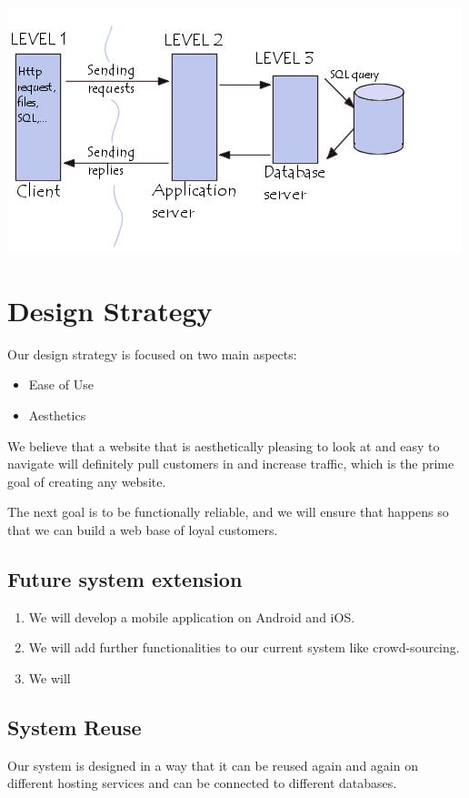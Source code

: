 \documentclass{scrreprt}
\begin{document}
\includegraphics[width=\textwidth]{3tier.jpeg}
\newpage

\section{Design Strategy}
Our design strategy is focused on two main aspects:
\begin{itemize}
    \item Ease of Use
    \item Aesthetics
\end{itemize}

We believe that a website that is aesthetically pleasing to look at and  easy to navigate will definitely pull customers in and increase traffic, which is the prime goal of creating any website.

The next goal is to be functionally reliable, and we will ensure that happens so that we can build a web base of loyal customers.

\subsection{Future system extension}
\begin{enumerate}
    \item We will develop a mobile application on Android and iOS.
    \item We will add further functionalities to our current system like crowd-sourcing.
    \item We will 
\end{enumerate}

\subsection{System Reuse}
Our system is designed in a way that it can be reused again and again on different hosting services and can be connected to different databases.
\end{document}
